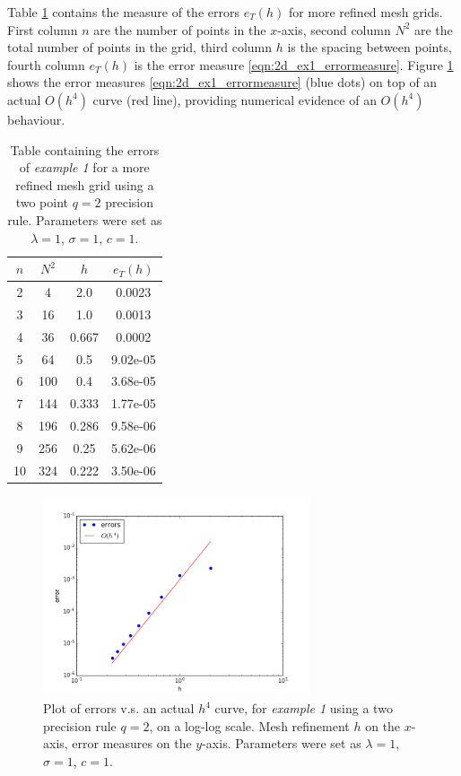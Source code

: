 \documentclass{uonmathreport}
\begin{document}
Table \ref{table:2dErrors_test1_q2} contains the measure of the errors $e_T(h)$ for more refined mesh grids. First column $n$ are the number of points in the $x$-axis, second column $N^2$ are the total number of points in the grid, third column $h$ is the spacing between points, fourth column $e_T(h)$ is the error measure \ref{eqn:2d_ex1_errormeasure}. Figure \ref{fig:2dErrors_test1_q2} shows the error measures \ref{eqn:2d_ex1_errormeasure} (blue dots) on top of an actual $O(h^4)$ curve (red line), providing numerical evidence of an $O(h^4)$ behaviour.
\begin{table}[H]
	\centering
\begin{tabular}{|c|c|c|c|}
	\hline
	$n$&$N^2$&$h$&$e_T(h)$\\
	\hline
	2&4&2.0&0.0023\\
	3&16&1.0&0.0013\\
	4&36&0.667&0.0002\\
	5&64&0.5&9.02e-05\\
	6&100&0.4&3.68e-05\\
	7&144&0.333&1.77e-05\\
	8&196&0.286&9.58e-06\\
	9&256&0.25&5.62e-06\\
	10&324&0.222&3.50e-06\\
	\hline
\end{tabular}
\caption{Table containing the errors of \textit{example 1} for a more refined mesh grid using a two point $q=2$ precision rule. Parameters were set as $\lambda=1$, $\sigma=1$, $c=1$.}
\label{table:2dErrors_test1_q2}
\end{table}

\begin{figure}[H]
	\begin{center}
		\includegraphics[width=0.7\textwidth]{Figures/2dRectTest1_q=2.png}
	\end{center}
	\caption{Plot of errors v.s. an actual $h^4$ curve, for \textit{example 1} using a two precision rule $q=2$, on a log-log scale. Mesh refinement $h$ on the $x$-axis, error measures on the $y$-axis. Parameters were set as $\lambda=1$, $\sigma=1$, $c=1$.}
	\label{fig:2dErrors_test1_q2}
\end{figure}
\end{document}
